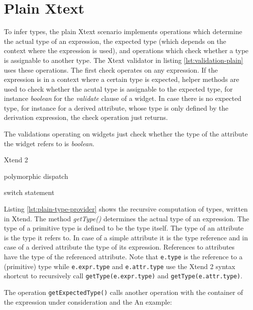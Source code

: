 \section{Plain Xtext}

To infer types, the plain Xtext scenario implements operations which determine the actual type of an expression, the expected type (which depends on the context where the expression is used), and operations which check whether a type is assignable to another type. The Xtext validator in listing \ref{lst:validation-plain} uses these operations. The first check operates on any expression. If the expression is in a context where a certain type is expected, helper methods are used to check whether the acutal type is assignable to the expected type, for instance \emph{boolean} for the \emph{validate} clause of a widget. 
In case there is no expected type, for instance for a derived attribute, whose type is only defined by the derivation expression, the check operation just returns.

The validations operating on widgets just check whether the type of the attribute the widget refers to is \emph{boolean}.




Xtend 2

polymorphic dispatch

switch statement

Listing \ref{lst:plain-type-provider} shows the recursive computation of types, written in Xtend. The method \emph{getType()} determines the actual type of an expression. The type of a primitive type is defined to be the type itself. The type of an attribute is the type it refers to. In case of a simple attribute it is the type reference and in case of a derived attribute the type of its expression. References to attributes have the type of the referenced attribute. Note that \verb|e.type| is the reference to a (primitive) type while \verb|e.expr.type| and \verb|e.attr.type| use the Xtend 2 syntax shortcut to recursively call \verb|getType(e.expr.type)| and \verb|getType(e.attr.type)|.

The operation \verb|getExpectedType()| calls another operation with the container of the expression under consideration and the 
An example: 





